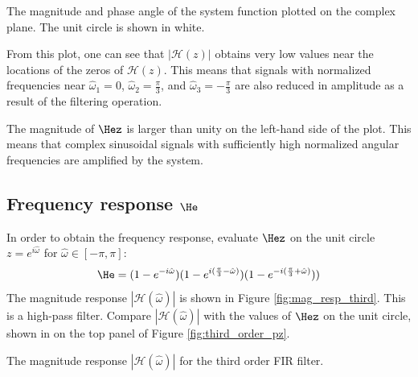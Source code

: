 \begin{marginfigure}
\begin{center}
\end{center}
\caption{The magnitude and phase angle of the system function plotted on the complex plane. The unit circle is shown in white.}
\label{fig:third_order_pz}
\end{marginfigure}

From this plot, one can see that $|\mathcal{H}(z)|$ obtains very low
values near the locations of the zeros of $\mathcal{H}(z)$. This means
that signals with normalized frequencies near $\hat{\omega}_1=0$,
$\hat{\omega}_2=\frac{\pi}{3}$, and $\hat{\omega}_3=-\frac{\pi}{3}$
are also reduced in amplitude as a result of the filtering operation.

The magnitude of $\Hez$ is larger than unity on the left-hand side of
the plot. This means that complex sinusoidal signals with sufficiently
high normalized angular frequencies are amplified by the system.




\subsection{Frequency response $\He$}

In order to obtain the frequency response, evaluate $\Hez$ on the unit
circle $z=e^{i\hat{\omega}}$ for $\hat{\omega}\in[-\pi,\pi]$:
\begin{equation}
\He = (1-e^{-i\hat{\omega}})(1-e^{i(\frac{\pi}{3}-\hat{\omega})})(1-e^{-i(\frac{\pi}{3}+\hat{\omega})}) )
\end{equation}
The magnitude response $|\mathcal{H}(\hat{\omega})|$ is shown in Figure
\ref{fig:mag_resp_third}. This is a high-pass filter. Compare
$|\mathcal{H}(\hat{\omega})|$ with the values of $\Hez$ on the unit
circle, shown in on the top panel of Figure \ref{fig:third_order_pz}.


\begin{marginfigure}
\begin{center}
\end{center}
\caption{The magnitude response $|\mathcal{H}(\hat{\omega})|$ for the third order FIR filter.}
\label{fig:mag_resp_third}
\end{marginfigure}

